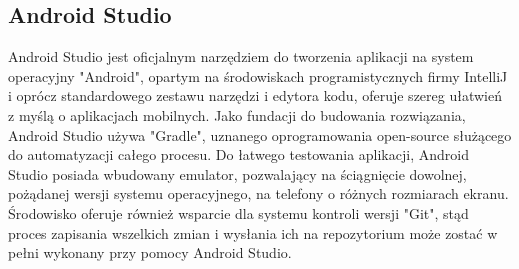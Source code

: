 \documentclass[12pt, a4paper]{article}
\begin{document}
\begin{sloppypar}
{  \subsection{Android Studio}
  {
    Android Studio jest oficjalnym narzędziem do tworzenia aplikacji na system operacyjny
    "Android", opartym na środowiskach programistycznych firmy IntelliJ i oprócz
    standardowego zestawu narzędzi i edytora kodu, oferuje szereg ułatwień z myślą
    o aplikacjach mobilnych. Jako fundacji do budowania rozwiązania, Android Studio używa
    "Gradle", uznanego oprogramowania open-source służącego do automatyzacji całego procesu.
    Do łatwego testowania aplikacji, Android Studio posiada wbudowany emulator, pozwalający
    na ściągnięcie dowolnej, pożądanej wersji systemu operacyjnego, na telefony o
    różnych rozmiarach ekranu. Środowisko oferuje również wsparcie dla systemu kontroli
    wersji "Git", stąd proces zapisania wszelkich zmian i wysłania ich na repozytorium
    może zostać w pełni wykonany przy pomocy Android Studio.
  }
}
\end{sloppypar}
\end{document}
